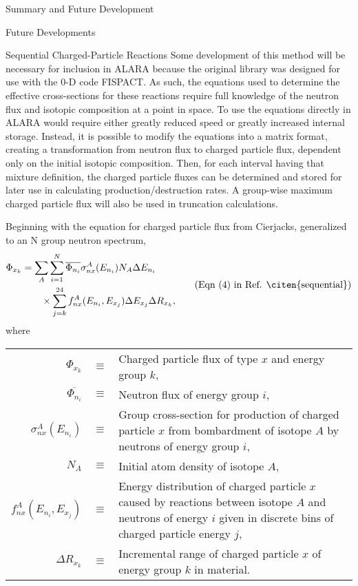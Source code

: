 \begin{chapter}{Summary and Future Development}
\begin{section}{Future Developments}
\begin{subsection}{Sequential Charged-Particle Reactions}
      Some development of this method will be necessary for inclusion
      in ALARA because the original library was designed for use with
      the 0-D code FISPACT.  As such, the equations used to determine
      the effective cross-sections for these reactions require full
      knowledge of the neutron flux and isotopic composition at a
      point in space.  To use the equations directly in ALARA would
      require either greatly reduced speed or greatly increased
      internal storage.  Instead, it is possible to modify the
      equations into a matrix format, creating a transformation from
      neutron flux to charged particle flux, dependent only on the
      initial isotopic composition.  Then, for each interval having
      that mixture definition, the charged particle fluxes can be
      determined and stored for later use in calculating
      production/destruction rates.  A group-wise maximum charged
      particle flux will also be used in truncation calculations.
    
      Beginning with the equation for charged particle flux from
      Cierjacks, generalized to an N group neutron spectrum,
      \begin{equation}
        \begin{split}
          \Phi_{x_k} &= \sum_A \sum_{i=1}^N \overline{\Phi_{n_i}} \sigma_{nx}^A(E_{n_i}) N_A
          \Delta E_{n_i}\\
          &\quad\quad \times \sum_{j=k}^{24} f_{nx}^A(E_{n_i},E_{x_j}) \Delta
          E_{x_j} \Delta R_{x_k},
        \end{split}
        \tag{Eqn (4) in Ref. \citen{sequential}}
      \end{equation}
      where\\
      \begin{tabular}{rcp{11cm}}
        $\Phi_{x_k}$ & $\equiv$ & Charged particle flux of type $x$ and energy group
        $k$,\\
        $\overline{\Phi_{n_i}}$ & $\equiv$ & Neutron flux of energy group $i$,\\
        $\sigma_{nx}^A(E_{n_i})$ & $\equiv$ & Group cross-section for production of
        charged particle $x$ from bombardment of isotope $A$ by neutrons of
        energy group $i$,\\
        $N_A$ & $\equiv$ & Initial atom density of isotope $A$,\\
        $f_{nx}^A(E_{n_i},E_{x_j})$ & $\equiv$ & Energy distribution of charged
        particle $x$ caused by reactions between isotope $A$ and neutrons of
        energy $i$ given in discrete bins of charged particle energy $j$,\\
        $\Delta R_{x_k}$ & $\equiv$ & Incremental range of charged particle $x$ of
        energy group $k$ in material.
      \end{tabular}
      

\end{subsection}
\end{section}
\end{chapter}
